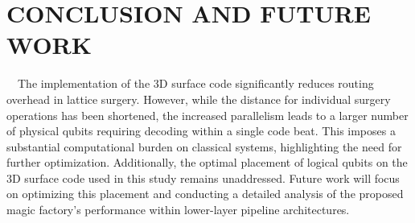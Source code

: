   \section{CONCLUSION AND FUTURE WORK}
  \vspace{-8pt}
  \ \ The implementation of the 3D surface code significantly reduces routing overhead in lattice surgery. However, while the distance for individual surgery operations has been shortened, the increased parallelism leads to a larger number of physical qubits requiring decoding within a single code beat. This imposes a substantial computational burden on classical systems, highlighting the need for further optimization. Additionally, the optimal placement of logical qubits on the 3D surface code used in this study remains unaddressed. Future work will focus on optimizing this placement and conducting a detailed analysis of the proposed magic factory's performance within lower-layer pipeline architectures.


\printbibliography

